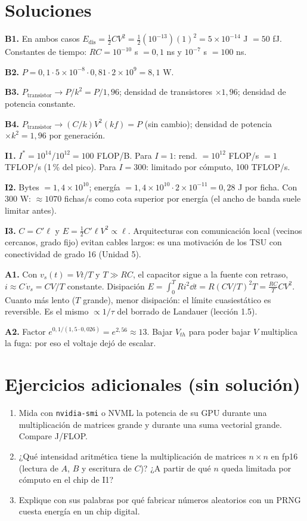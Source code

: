 \documentclass[11pt,a4paper]{article}
\begin{document}
\section{Soluciones}
\begin{solucion}
\textbf{B1.} En ambos casos $E_{\text{dis}}=\tfrac12CV^2=\tfrac12(10^{-13})(1)^2=5\times10^{-14}$ J $=50$ fJ. Constantes de tiempo: $RC=10^{-10}$ s $=0{,}1$ ns y $10^{-7}$ s $=100$ ns.

\textbf{B2.} $P=0{,}1\cdot5\times10^{-8}\cdot0{,}81\cdot2\times10^9=8{,}1$ W.

\textbf{B3.} $P_{\text{transistor}}\to P/k^2=P/1{,}96$; densidad de transistores $\times1{,}96$; densidad de potencia constante.

\textbf{B4.} $P_{\text{transistor}}\to(C/k)V^2(kf)=P$ (sin cambio); densidad de potencia $\times k^2=1{,}96$ por generación.

\textbf{I1.} $I^*=10^{14}/10^{12}=100$ FLOP/B. Para $I=1$: rend. $=10^{12}$ FLOP/s $=1$ TFLOP/s (1\,\% del pico). Para $I=300$: limitado por cómputo, 100 TFLOP/s.

\textbf{I2.} Bytes $=1{,}4\times10^{10}$; energía $=1{,}4\times10^{10}\cdot2\times10^{-11}=0{,}28$ J por ficha. Con 300 W: $\approx1070$ fichas/s como cota superior por energía (el ancho de banda suele limitar antes).

\textbf{I3.} $C=C'\ell$ y $E=\tfrac12C'\ell V^2\propto\ell$. Arquitecturas con comunicación local (vecinos cercanos, grado fijo) evitan cables largos: es una motivación de los TSU con conectividad de grado 16 (Unidad 5).

\textbf{A1.} Con $v_s(t)=Vt/T$ y $T\gg RC$, el capacitor sigue a la fuente con retraso, $i\approx C\,\dot v_s=CV/T$ constante. Disipación $E=\int_0^TRi^2\dd t=R(CV/T)^2T=\frac{RC}{T}CV^2$. Cuanto más lento ($T$ grande), menor disipación: el límite cuasiestático es reversible. Es el mismo $\propto1/\tau$ del borrado de Landauer (lección 1.5).

\textbf{A2.} Factor $e^{0{,}1/(1{,}5\cdot0{,}026)}=e^{2{,}56}\approx13$. Bajar $V_{th}$ para poder bajar $V$ multiplica la fuga: por eso el voltaje dejó de escalar.
\end{solucion}

\section{Ejercicios adicionales (sin solución)}
\begin{enumerate}[label=\textbf{P\arabic*.}]
\item Mida con \texttt{nvidia-smi} o NVML la potencia de su GPU durante una multiplicación de matrices grande y durante una suma vectorial grande. Compare J/FLOP.
\item ¿Qué intensidad aritmética tiene la multiplicación de matrices $n\times n$ en fp16 (lectura de $A$, $B$ y escritura de $C$)? ¿A partir de qué $n$ queda limitada por cómputo en el chip de I1?
\item Explique con sus palabras por qué fabricar números aleatorios con un PRNG cuesta energía en un chip digital.
\end{enumerate}
\end{document}
